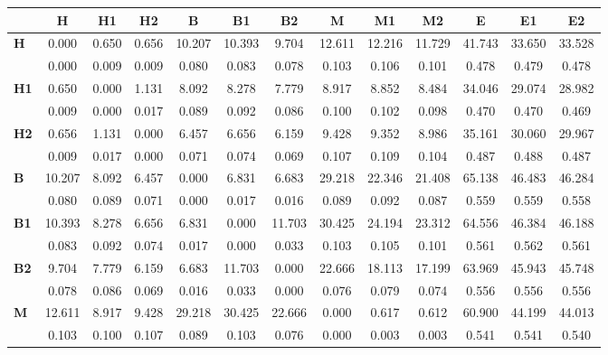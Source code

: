\begin{table*}[h!]
\begin{center}
\begin{tabular}{| l || c | c | c || c | c | c || c | c | c || c | c | c |}\hline
 & {\bf H} & {\bf H1} & {\bf H2} & {\bf B} & {\bf B1} & {\bf B2} & {\bf M} & {\bf M1} & {\bf M2} & {\bf E} & {\bf E1} & {\bf E2} \\\hline\hline
{\bf H} & 0.000 & 0.650 & 0.656 & 10.207 & 10.393 & 9.704 & 12.611 & 12.216 & 11.729 & 41.743 & 33.650 & 33.528 \\
 & 0.000  & 0.009  & 0.009  & 0.080  & 0.083  & 0.078  & 0.103  & 0.106  & 0.101  & 0.478  & 0.479  & 0.478 \\\hline
{\bf H1} & 0.650 & 0.000 & 1.131 & 8.092 & 8.278 & 7.779 & 8.917 & 8.852 & 8.484 & 34.046 & 29.074 & 28.982 \\
 & 0.009  & 0.000  & 0.017  & 0.089  & 0.092  & 0.086  & 0.100  & 0.102  & 0.098  & 0.470  & 0.470  & 0.469 \\\hline
{\bf H2} & 0.656 & 1.131 & 0.000 & 6.457 & 6.656 & 6.159 & 9.428 & 9.352 & 8.986 & 35.161 & 30.060 & 29.967 \\
 & 0.009  & 0.017  & 0.000  & 0.071  & 0.074  & 0.069  & 0.107  & 0.109  & 0.104  & 0.487  & 0.488  & 0.487 \\\hline\hline
{\bf B} & 10.207 & 8.092 & 6.457 & 0.000 & 6.831 & 6.683 & 29.218 & 22.346 & 21.408 & 65.138 & 46.483 & 46.284 \\
 & 0.080  & 0.089  & 0.071  & 0.000  & 0.017  & 0.016  & 0.089  & 0.092  & 0.087  & 0.559  & 0.559  & 0.558 \\\hline
{\bf B1} & 10.393 & 8.278 & 6.656 & 6.831 & 0.000 & 11.703 & 30.425 & 24.194 & 23.312 & 64.556 & 46.384 & 46.188 \\
 & 0.083  & 0.092  & 0.074  & 0.017  & 0.000  & 0.033  & 0.103  & 0.105  & 0.101  & 0.561  & 0.562  & 0.561 \\\hline
{\bf B2} & 9.704 & 7.779 & 6.159 & 6.683 & 11.703 & 0.000 & 22.666 & 18.113 & 17.199 & 63.969 & 45.943 & 45.748 \\
 & 0.078  & 0.086  & 0.069  & 0.016  & 0.033  & 0.000  & 0.076  & 0.079  & 0.074  & 0.556  & 0.556  & 0.556 \\\hline\hline
{\bf M} & 12.611 & 8.917 & 9.428 & 29.218 & 30.425 & 22.666 & 0.000 & 0.617 & 0.612 & 60.900 & 44.199 & 44.013 \\
 & 0.103  & 0.100  & 0.107  & 0.089  & 0.103  & 0.076  & 0.000  & 0.003  & 0.003  & 0.541  & 0.541  & 0.540 \\\hline

\end{tabular}
\end{center}
\end{table*}
